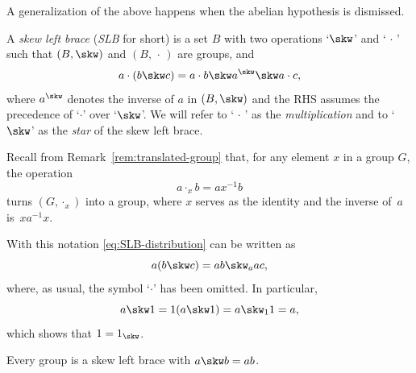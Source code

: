 A generalization of the above happens when the abelian hypothesis is dismissed.

\begin{defn}
      A \textsl{skew left brace} (\textsl{SLB} for short) is a set\/ $B$ with two operations\/ `$\skw$' and\/ `$\,\cdot\,$' such that\/ $(B,\skw)$ and\/ $(B,\,\cdot\,)$ are groups, and
    \begin{equation}\label{eq:SLB-distribution}
        a\cdot (b\skw c) = a\cdot b\skw a^\skw\skw a\cdot c,
    \end{equation}
    where\/ $a^\skw$ denotes the inverse of\/ $a$ in\/ $(B,\skw)$ and the RHS assumes the precedence of\/ `$\cdot$' over `$\skw$'. We will refer to `$\,\cdot\,$' as the \textsl{multiplication\/} and to `$\skw$' as the \textsl{star} of the skew left brace.
\end{defn}

\begin{rem}
    Recall from Remark~\ref{rem:translated-group} that, for any element $x$ in a group $G$, the operation
    $$
        a\cdot_x b = ax^{-1}b
    $$
    turns $(G,\cdot_x)$ into a group, where $x$ serves as the identity and the inverse of~$a$ is~$xa^{-1}x$.

    With this notation \eqref{eq:SLB-distribution} can be written as
    \begin{equation}\label{eq:skew-left-brace-translated}
        a(b\skw c) = ab\skw_a ac,
    \end{equation}
    where, as usual, the symbol `$\cdot$' has been omitted. In particular,
    $$
        a\skw1=1(a\skw1) = a\skw_11= a,
    $$
    which shows that $1=1_{\skw}$.
\end{rem}

\begin{rem}
    Every group is a skew left brace with $a\skw b=ab$.
\end{rem}

